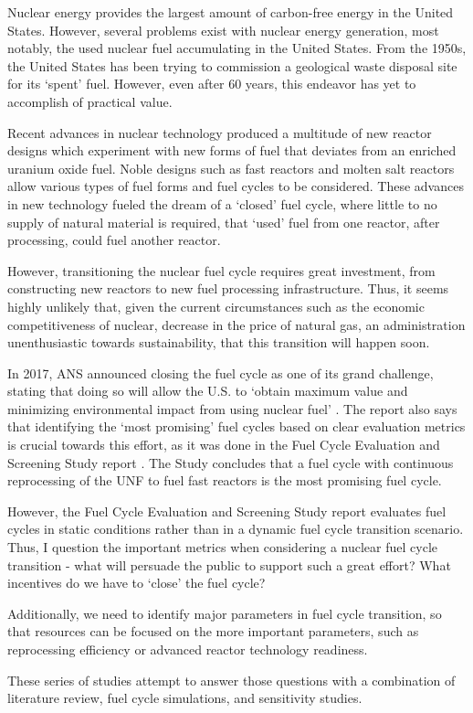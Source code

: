Nuclear energy provides the largest amount of carbon-free energy
in the United States. However, several problems exist with nuclear
energy generation, most notably, the used nuclear fuel accumulating
in the United States.
From the 1950s, the United States has been trying to commission a
geological waste disposal site for its `spent' fuel. However, even
after 60 years, this endeavor has yet to accomplish of practical value.

Recent advances in nuclear technology produced
a multitude of new reactor designs which experiment with new forms
of fuel that deviates from an enriched uranium oxide fuel.
Noble designs such as fast reactors and molten salt reactors
allow various types of fuel forms and fuel cycles to be considered. These advances in new
technology fueled the dream of a `closed' fuel cycle, where little to no
supply of natural material is required, that `used' fuel from one reactor,
after processing, could fuel another reactor.

However, transitioning the nuclear fuel cycle requires great investment,
from constructing new reactors to new fuel processing infrastructure.
Thus, it seems highly unlikely that, given the current circumstances
such as the economic competitiveness of nuclear, decrease in the price of natural
gas, an administration unenthusiastic towards sustainability, that
this transition will happen soon.

In 2017, \gls{ANS} announced closing the fuel cycle as one of its
grand challenge, stating that doing so will allow the U.S.
to `obtain maximum value and minimizing environmental
impact from using nuclear fuel' \cite{_ans_2017}.
The report also says that identifying the `most promising'
fuel cycles based on clear evaluation metrics is crucial towards
this effort, as it was done in the Fuel Cycle Evaluation and Screening
Study report \cite{wigeland_nuclear_2014}. The Study concludes that
a fuel cycle with continuous reprocessing of the \gls{UNF} to
fuel fast reactors is the most promising fuel cycle.

However, the Fuel Cycle Evaluation and Screening Study report
evaluates fuel cycles in static conditions rather than
in a dynamic fuel cycle transition scenario.
Thus, I question the important metrics when considering
a nuclear fuel cycle transition - what will persuade
the public to support such a great effort? What incentives
do we have to `close' the fuel cycle?

Additionally, we need to identify major parameters in
fuel cycle transition, so that resources can be
focused on the more important parameters, such as reprocessing
efficiency or advanced reactor technology readiness.

These series of studies attempt to answer those questions with a
combination of literature review, fuel cycle simulations, and sensitivity
studies.
